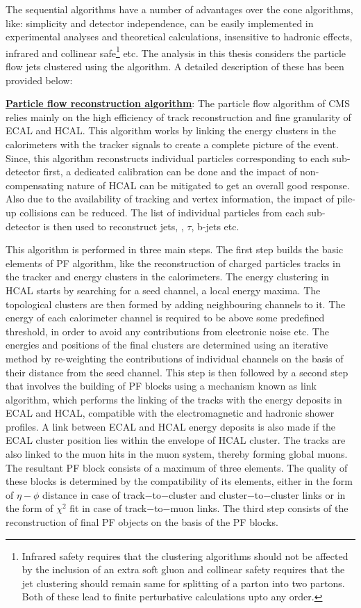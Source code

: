 The sequential algorithms have a number of advantages over the cone algorithms, like: simplicity and detector independence, can be easily implemented in experimental
analyses and theoretical calculations, insensitive to hadronic effects, infrared and collinear safe\footnote{Infrared safety requires that the clustering
  algorithms should not be affected by the inclusion of an extra soft gluon and collinear safety requires that the jet clustering should remain same for
  splitting of a parton into two partons. Both of these lead to finite perturbative calculations upto any order.} etc.
The analysis in this thesis considers the particle flow jets clustered using the \antikt algorithm. A detailed description of these has been provided below:

\noindent
\underline{\bf{Particle flow reconstruction algorithm}}:
The particle flow algorithm of CMS~\cite{Sirunyan:2017ulk, CMS-PAS-PFT-09-001} relies mainly on the high efficiency of track reconstruction and fine granularity
of ECAL and HCAL. This algorithm works by linking the energy clusters in the calorimeters with the tracker signals to create a complete picture of the event.
Since, this algorithm reconstructs individual particles corresponding to each sub-detector first, a dedicated calibration can be done and the impact of
non-compensating nature of HCAL can be mitigated to get an overall good response. Also due to the availability of tracking and vertex information,
the impact of pile-up collisions can be reduced. The list of individual particles from each sub-detector is then used to reconstruct jets, \met, $\tau$, b-jets etc. 

This algorithm is performed in three main steps. The first step builds the basic elements of PF algorithm, like the
reconstruction of charged particles tracks in the tracker and energy clusters in the
calorimeters. The energy clustering in HCAL starts by searching for a seed channel, a local energy maxima. The topological clusters are then formed by adding neighbouring
channels to it. The energy of each calorimeter channel is required to be above some predefined threshold, in order to avoid any contributions from electronic noise etc.
The energies and positions of the final clusters are determined using an iterative method by re-weighting the contributions of individual channels
on the basis of their distance from the seed channel. 
This step is then followed by a second step that involves the building of PF blocks using a mechanism known as link algorithm, which performs the
linking of the tracks with the energy deposits in ECAL and HCAL, compatible with the electromagnetic and hadronic shower profiles.
A link between ECAL and HCAL energy deposits is also made if the ECAL cluster position lies within the envelope of HCAL cluster. The tracks are also linked to
the muon hits in the muon system, thereby forming global muons. The resultant PF block consists of a maximum of three elements.
The quality of these blocks is determined by the compatibility of its elements, either in the form of $\eta-\phi$ distance in case of track$-$to$-$cluster and
cluster$-$to$-$cluster links or in the form of $\chi^{2}$ fit in case of track$-$to$-$muon links. The third step consists of the reconstruction of final PF objects on the
basis of the PF blocks.

